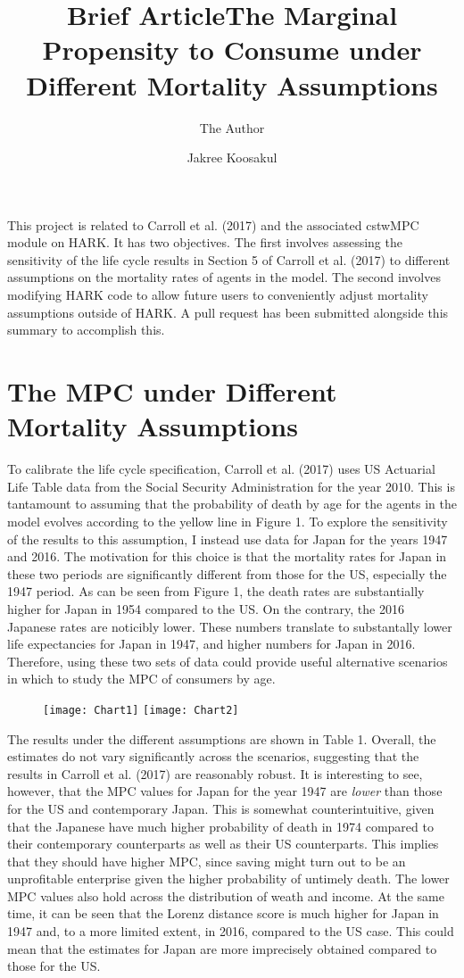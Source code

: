 \documentclass[11pt]{article} %
\title{Brief Article}
\author{The Author}
\author{Jakree Koosakul}
\title{The Marginal Propensity to Consume under Different Mortality Assumptions}
\begin{document}
\maketitle


This project is related to Carroll et al. (2017) and the associated cstwMPC module on HARK. It has two objectives. The first involves assessing the sensitivity of the life cycle results in Section 5 of Carroll et al. (2017) to different assumptions on the mortality rates of agents in the model. The second involves modifying HARK code to allow future users to conveniently adjust mortality assumptions outside of HARK. A pull request has been submitted alongside this summary to accomplish this. 

\section{The MPC under Different Mortality Assumptions}

To calibrate the life cycle specification, Carroll et al. (2017) uses US Actuarial Life Table data from the Social Security Administration for the year 2010. This is tantamount to assuming that the probability of death by age for the agents in the model evolves according to the yellow line in Figure 1. To explore the sensitivity of the results to this assumption, I instead use data for Japan for the years 1947 and 2016. The motivation for this choice is that the mortality rates for Japan in these two periods are significantly different from those for the US, especially the 1947 period. As can be seen from Figure 1, the death rates are substantially higher for Japan in 1954 compared to the US. On the contrary, the 2016 Japanese rates are noticibly lower. These numbers translate to substantally lower life expectancies for Japan in 1947, and higher numbers for Japan in 2016. Therefore, using these two sets of data could provide useful alternative scenarios in which to study the MPC of consumers by age.

\begin{figure}
  \texttt{[image: Chart1]}
  \texttt{[image: Chart2]}
\end{figure}    

The results under the different assumptions are shown in Table 1. Overall, the estimates do not vary significantly across the scenarios, suggesting that the results in Carroll et al. (2017) are reasonably robust. It is interesting to see, however, that the MPC values for Japan for the year 1947 are \textit{lower} than those for the US and contemporary Japan. This is somewhat counterintuitive, given that the Japanese have much higher probability of death in 1974 compared to their contemporary counterparts as well as their US counterparts. This implies that they should have higher MPC, since saving might turn out to be an unprofitable enterprise given the higher probability of untimely death. The lower MPC values also hold across the distribution of weath and income. At the same time, it can be seen that the Lorenz distance score is much higher for Japan in 1947 and, to a more limited extent, in 2016, compared to the US case. This could mean that the estimates for Japan are more imprecisely obtained compared to those for the US.  
\end{document}
